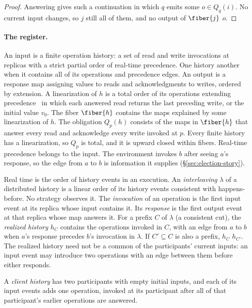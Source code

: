 \begin{proof}
Answering gives such a continuation in which $q$ emits some $o\in Q_q(i)$.  No
current input changes, so $j$ still \inrel all of them, and no output of
$\fiber{j}$ \outrel $o$.
\end{proof}

\paragraph{The register.}
An input is a finite operation history: a set of read and write invocations at
replicas with a strict partial order of real-time precedence.  One history
\inrel another when it contains all of its operations and precedence edges.
An output is a response map assigning values to reads and acknowledgments to
writes, ordered by extension.  A linearization of $h$ is a total order of its
operations extending precedence~\cite{herlihy1990linearizability} in which
each answered read returns the last preceding write, or the initial value
$v_0$.  The fiber $\fiber{h}$ contains the maps explained by some
linearization of $h$.  The obligation $Q_p(h)$ consists of the maps in
$\fiber{h}$ that answer every read and acknowledge every write invoked at $p$.
Every finite history has a linearization, so $Q_p$ is total, and it is upward
closed within fibers.  Real-time precedence belongs to the input.  The
environment invokes $b$ after seeing $a$'s response, so the edge from $a$ to
$b$ is information it supplies (\S\ref{sec:election-story}).

Real time is the order of history events in an execution.  An
\emph{interleaving} $\lambda$ of a distributed history is a linear order of
its history events consistent with happens-before.  No strategy observes it.
The \emph{invocation} of an operation is the first input event at its replica
whose input contains it.  Its \emph{response} is the first output event at
that replica whose map answers it.  For a prefix $C$ of $\lambda$ (a
consistent cut), the \emph{realized history} $h_C$ contains the operations
invoked in $C$, with an edge from $a$ to $b$ when $a$'s response precedes
$b$'s invocation in $\lambda$.  If $C'\subseteq C$ is also a prefix, $h_C$
\inrel $h_{C'}$.  The realized history need not be a common \indesc of the
participants' current inputs: an input event may introduce two operations with
an edge between them before either responds.

A \emph{client history} has two participants with empty initial inputs, and
each of its input events adds one operation, invoked at its participant after
all of that participant's earlier operations are answered.


